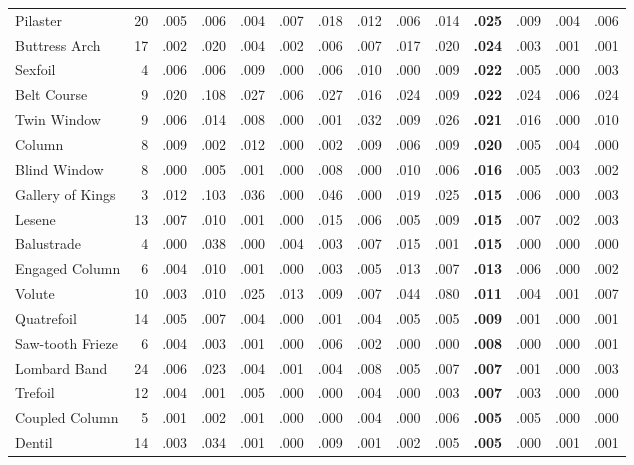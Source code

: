 \documentclass[lineno,pdflatex,sn-mathphys-num]{sn-jnl}%
\theoremstyle{thmstyleone}%
\theoremstyle{thmstyletwo}%
\theoremstyle{thmstylethree}%
\begin{document}
\begin{appendices}
\begin{table}[!htbp]
\begin{tabular}{@{}lrcccccccccccc@{}}
Pilaster & 20 & .005 & .006 & .004 & .007 & .018 & .012 & .006 & .014 & \textbf{.025} & .009 & .004 & .006 \\
Buttress Arch & 17 & .002 & .020 & .004 & .002 & .006 & .007 & .017 & .020 & \textbf{.024} & .003 & .001 & .001 \\
Sexfoil & 4 & .006 & .006 & .009 & .000 & .006 & .010 & .000 & .009 & \textbf{.022} & .005 & .000 & .003 \\
Belt Course & 9 & .020 & .108 & .027 & .006 & .027 & .016 & .024 & .009 & \textbf{.022} & .024 & .006 & .024 \\
Twin Window & 9 & .006 & .014 & .008 & .000 & .001 & .032 & .009 & .026 & \textbf{.021} & .016 & .000 & .010 \\
Column & 8 & .009 & .002 & .012 & .000 & .002 & .009 & .006 & .009 & \textbf{.020} & .005 & .004 & .000 \\
Blind Window & 8 & .000 & .005 & .001 & .000 & .008 & .000 & .010 & .006 & \textbf{.016} & .005 & .003 & .002 \\
Gallery of Kings & 3 & .012 & .103 & .036 & .000 & .046 & .000 & .019 & .025 & \textbf{.015} & .006 & .000 & .003 \\
Lesene & 13 & .007 & .010 & .001 & .000 & .015 & .006 & .005 & .009 & \textbf{.015} & .007 & .002 & .003 \\
Balustrade & 4 & .000 & .038 & .000 & .004 & .003 & .007 & .015 & .001 & \textbf{.015} & .000 & .000 & .000 \\
Engaged Column & 6 & .004 & .010 & .001 & .000 & .003 & .005 & .013 & .007 & \textbf{.013} & .006 & .000 & .002 \\
Volute & 10 & .003 & .010 & .025 & .013 & .009 & .007 & .044 & .080 & \textbf{.011} & .004 & .001 & .007 \\
Quatrefoil & 14 & .005 & .007 & .004 & .000 & .001 & .004 & .005 & .005 & \textbf{.009} & .001 & .000 & .001 \\
Saw-tooth Frieze & 6 & .004 & .003 & .001 & .000 & .006 & .002 & .000 & .000 & \textbf{.008} & .000 & .000 & .001 \\
Lombard Band & 24 & .006 & .023 & .004 & .001 & .004 & .008 & .005 & .007 & \textbf{.007} & .001 & .000 & .003 \\
Trefoil & 12 & .004 & .001 & .005 & .000 & .000 & .004 & .000 & .003 & \textbf{.007} & .003 & .000 & .000 \\
Coupled Column & 5 & .001 & .002 & .001 & .000 & .000 & .004 & .000 & .006 & \textbf{.005} & .005 & .000 & .000 \\
Dentil & 14 & .003 & .034 & .001 & .000 & .009 & .001 & .002 & .005 & \textbf{.005} & .000 & .001 & .001 \\

\end{tabular}
\end{table}
\end{appendices}
\end{document}
